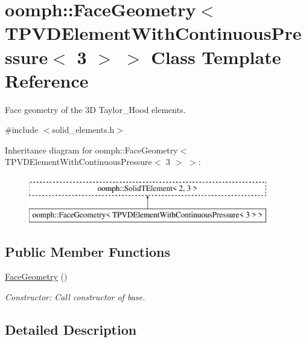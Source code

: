 \hypertarget{classoomph_1_1FaceGeometry_3_01TPVDElementWithContinuousPressure_3_013_01_4_01_4}{}\section{oomph\+:\+:Face\+Geometry$<$ T\+P\+V\+D\+Element\+With\+Continuous\+Pressure$<$ 3 $>$ $>$ Class Template Reference}
\label{classoomph_1_1FaceGeometry_3_01TPVDElementWithContinuousPressure_3_013_01_4_01_4}


Face geometry of the 3D Taylor\+\_\+\+Hood elements.  




{\ttfamily \#include $<$solid\+\_\+elements.\+h$>$}

Inheritance diagram for oomph\+:\+:Face\+Geometry$<$ T\+P\+V\+D\+Element\+With\+Continuous\+Pressure$<$ 3 $>$ $>$\+:\begin{figure}[H]
\begin{center}
\leavevmode
\includegraphics[height=2.000000cm]{classoomph_1_1FaceGeometry_3_01TPVDElementWithContinuousPressure_3_013_01_4_01_4}
\end{center}
\end{figure}
\subsection*{Public Member Functions}
\begin{DoxyCompactItemize}
\item 
\hyperlink{classoomph_1_1FaceGeometry_3_01TPVDElementWithContinuousPressure_3_013_01_4_01_4_ae0c645d16ae9253ecc4ee97bec72a7c9}{Face\+Geometry} ()
\begin{DoxyCompactList}\small\item\em Constructor\+: Call constructor of base. \end{DoxyCompactList}\end{DoxyCompactItemize}


\subsection{Detailed Description}
